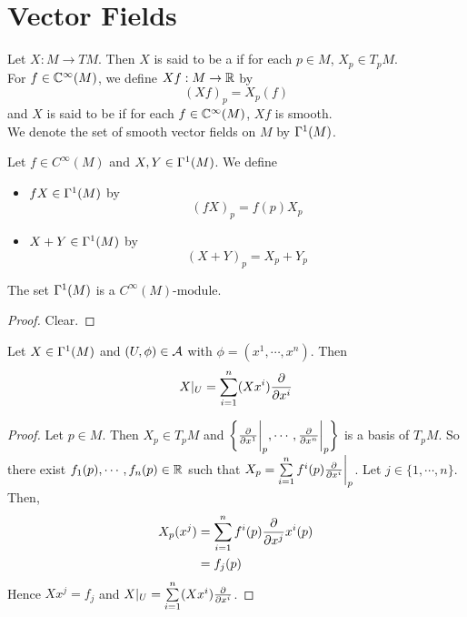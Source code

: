 \documentclass{book}
\begin{document}
	
	
	
	
	
	
	
	
	
	
	
	
	
	\newpage	
	\section{Vector Fields}
	
	\begin{defn}
		Let $X: M \rightarrow TM$. Then $X$ is said to be a  if for each $p \in M$, $X_p \in T_p M$. \\
		For $f \in \mathbb{C}^{\infty}(M)$, we define $Xf : M \rightarrow \mathbb{R}$ by $$(Xf)_p = X_p(f)$$ 
		and $X$ is said to be  if for each $f \in \mathbb{C}^{\infty}(M)$, $Xf$ is smooth.\\
		We denote the set of smooth vector fields on $M$ by $\Gamma^1(M)$.
	\end{defn}

	\begin{defn}
	Let $f \in C^{\infty}(M)$ and $X,Y \in \Gamma^1(M)$. We define 
	\begin{itemize}
	\item $fX \in \Gamma^1(M)$ by $$(fX)_p = f(p)X_p$$
	\item $X+Y \in \Gamma^1(M)$ by $$(X+Y)_p = X_p+Y_p$$
	\end{itemize}
	\end{defn}
	
	\begin{ex}
	The set $\Gamma^1(M)$ is a $C^{\infty}(M)$-module.
	\end{ex}
	
	\begin{proof}
	Clear.
	\end{proof}

	\begin{ex}
		Let $X \in \Gamma^1(M)$ and $(U, \phi) \in \mathcal{A}$ with $\phi = (x^1, \cdots, x^n)$. Then $$X|_U = \sum_{i=1}^n (Xx^i)\frac{\partial}{\partial x^i}$$ 
	\end{ex}

	\begin{proof}
		Let $p \in M$. Then $X_p \in T_pM$ and $\bigg \{ \frac{\partial}{\partial x^1} \bigg|_p, \cdots, \frac{\partial}{\partial x^n} \bigg|_p \bigg \}$ is a basis of $T_pM$. So there exist $f_1(p), \cdots, f_n(p) \in \mathbb{R}$ such that $X_p = \sum\limits_{i=1}^n f^i(p) \frac{\partial}{\partial x^i} \bigg |_p $. Let $j \in \{1, \cdots, n\}$. Then,
		\begin{align*}
			X_p(x^j) 
			&= \sum\limits_{i=1}^n f^i(p) {\frac{\partial}{\partial x^j}{x^i}}(p) \\
			&= f_j(p) \\
		\end{align*} 
		Hence $Xx^j = f_j$ and $X|_U = \sum\limits_{i=1}^n (Xx^i)\frac{\partial}{\partial x^i}$.
	\end{proof}
	
\end{document}
